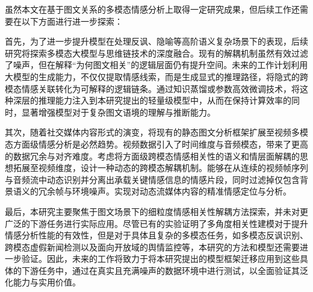 虽然本文在基于图文关系的多模态情感分析上取得一定研究成果，但后续工作还需要在以下方面进行进一步探索：

首先，为了进一步提升模型在处理反讽、隐喻等高阶语义复杂场景下的表现，后续研究将探索多模态大模型与思维链技术的深度融合。现有的解耦机制虽然有效过滤了噪声，但在解释“为何图文相关”的逻辑层面仍有提升空间。未来的工作计划利用大模型的生成能力，不仅仅提取情感线索，而是生成显式的推理路径，将隐式的跨模态情感关联转化为可解释的逻辑链条。通过知识蒸馏或参数高效微调技术，将这种深层的推理能力注入到本研究提出的轻量级模型中，从而在保持计算效率的同时，显著增强模型对于复杂图文语境的理解与推断能力。

其次，随着社交媒体内容形式的演变，将现有的静态图文分析框架扩展至视频多模态方面级情感分析是必然趋势。视频数据引入了时间维度与音频模态，带来了更高的数据冗余与对齐难度。考虑将方面级跨模态情感相关性的语义和情层面解耦的思想拓展至视频维度，设计一种动态的跨模态解耦机制。能够在从连续的视频帧序列与音频流中动态识别并分离出承载关键情感信息的情感片段，同时过滤掉仅包含背景语义的冗余帧与环境噪声。实现对动态流媒体内容的精准情感定位与分析。

最后，本研究主要聚焦于图文场景下的细粒度情感相关性解耦方法探索，并未对更广泛的下游任务进行实际应用。尽管已有的实验证明了多角度相关性建模对于提升情感分析性能的有效性，但是对于具体且复杂的多模态任务，如多模态反讽识别、跨模态虚假新闻检测以及面向开放域的舆情监控等，本研究的方法和模型还需要进一步验证。因此，未来的工作将致力于将本研究提出的模型框架迁移应用到这些具体的下游任务中，通过在真实且充满噪声的数据环境中进行测试，以全面验证其泛化能力与实用价值。